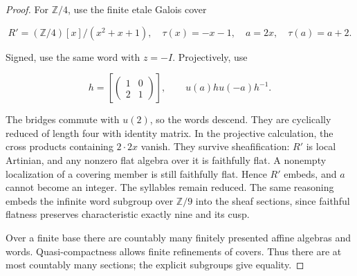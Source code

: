 \begin{proof}
For $\mathbb Z/4$, use the finite etale Galois cover

$$
R'=(\mathbb Z/4)[x]/(x^2+x+1),\quad
 \tau(x)=-x-1,\quad a=2x,\quad \tau(a)=a+2.
$$

Signed, use the same word with $z=-I$.
Projectively, use

$$
h=\left[\begin{pmatrix}1&0\\2&1\end{pmatrix}\right],
 \qquad u(a)hu(-a)h^{-1}.
$$

The bridges commute with $u(2)$, so the words descend.
They are cyclically reduced of length four with identity
matrix. In the projective calculation, the cross products
containing $2\cdot2x$ vanish.
They survive sheafification: $R'$ is local Artinian, and
any nonzero flat algebra over it is faithfully flat.
A nonempty localization of a covering member is still
faithfully flat. Hence $R'$ embeds, and $a$ cannot become
an integer. The syllables remain reduced.
The same reasoning embeds the infinite word subgroup
over $\mathbb Z/9$ into the sheaf sections, since faithful
flatness preserves characteristic exactly nine and its cusp.

Over a finite base there are countably many finitely presented
affine algebras and words. Quasi-compactness allows finite
refinements of covers. Thus there are at most countably
many sections; the explicit subgroups give equality.
\end{proof}

